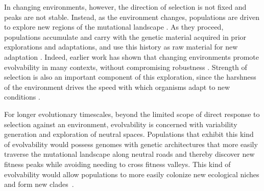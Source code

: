 \documentclass[10pt,letterpaper]{article}
\begin{document}
In changing environments, however, the direction of selection is not fixed and peaks are not stable.  Instead, as the environment changes, populations are driven to explore new regions of the mutational landscape \cite{kashtan_varying_2007,connelly_negative_2015}. As they proceed, populations accumulate and carry with the genetic material acquired in prior explorations and adaptations, and use this history as raw material for new adaptation \cite{mcclintock_significance_1993}. Indeed, earlier work has shown that changing environments promote evolvability in many contexts, without compromising robustness \cite{crombach_evolution_2008,wilke_evolution_2001}. Strength of selection is also an important component of this exploration, since the harshness of the environment drives the speed with which organisms adapt to new conditions \cite{goddard_sex_2005}.


For longer evolutionary timescales, beyond the limited scope of direct response to selection against an environment, 
evolvability is concerned with variability generation and exploration of neutral spaces.
Populations that exhibit this kind of evolvability would possess genomes with genetic architectures
that more easily traverse the mutational landscape along neutral roads and thereby discover new fitness peaks while avoiding needing to cross fitness valleys.
This kind of evolvability would allow populations to more easily colonize new ecological niches and form new clades~\cite{kirschner_evolvability_1998,brookfield_evolution:_2001}.
\end{document}
